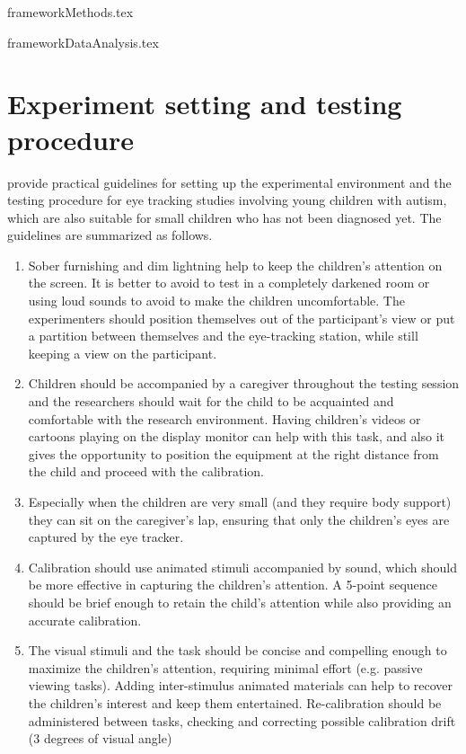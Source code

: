 {frameworkMethods.tex}

{frameworkDataAnalysis.tex}



\section{Experiment setting and testing procedure}
\label{sec:fwksettingprocedure}

\cite{sasson2012children} provide practical guidelines for setting up the experimental environment and the testing procedure for eye tracking studies involving young children with autism, which are also suitable for small children who has not been diagnosed yet. The guidelines are summarized as follows.
\begin{enumerate}
    \item Sober furnishing and dim lightning help to keep the children’s attention on the screen. It is better to avoid to test in a completely darkened room or using loud sounds to avoid to make the children uncomfortable. The experimenters should position themselves out of the participant’s view or put a partition between themselves and the eye-tracking station, while still keeping a view on the participant.
    \item Children should be accompanied by a caregiver throughout the testing session and the researchers should wait for the child to be acquainted and comfortable with the research environment. Having children's videos or cartoons playing on the display monitor can help with this task, and also it gives the opportunity to position the equipment at the right distance from the child and proceed with the calibration.
    \item Especially when the children are very small (and they require body support) they can sit on the caregiver’s lap, ensuring that only the children’s eyes are captured by the eye tracker.
    \item Calibration should use animated stimuli accompanied by sound, which should be more effective in capturing the children’s attention. A 5-point sequence should be brief enough to retain the child's attention while also providing an accurate calibration.
    \item The visual stimuli and the task should be concise and compelling enough to maximize the children’s attention, requiring minimal effort (e.g. passive viewing tasks). Adding inter-stimulus animated materials can help to recover the children’s interest and keep them entertained. Re-calibration should be administered between tasks, checking and correcting possible calibration drift (3 degrees of visual angle) 
\end{enumerate}

